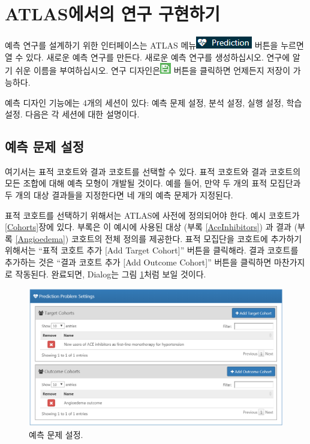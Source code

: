 \documentclass[11pt]{book}
\theoremstyle{definition}
\theoremstyle{definition}
\theoremstyle{definition}
\theoremstyle{remark}
\begin{document}
\section{ATLAS에서의 연구 구현하기}\label{atlas--}

예측 연구를 설계하기 위한 인터페이스는 ATLAS
메뉴\includegraphics{images/PatientLevelPrediction/predictionButton.png}
버튼을 누르면 열 수 있다. 새로운 예측 연구를 만든다. 새로운 예측 연구를
생성하십시오. 연구에 알기 쉬운 이름을 부여하십시오. 연구
디자인은\includegraphics{images/PopulationLevelEstimation/save.png}
버튼을 클릭하면 언제든지 저장이 가능하다. 

예측 디자인 기능에는 4개의 세션이 있다: 예측 문제 설정, 분석 설정, 실행
설정, 학습 설정. 다음은 각 세션에 대한 설명이다.

\subsection{예측 문제 설정}\label{--}

여기서는 표적 코호트와 결과 코호트를 선택할 수 있다. 표적 코호트와 결과
코호트의 모든 조합에 대해 예측 모형이 개발될 것이다. 예를 들어, 만약 두
개의 표적 모집단과 두 개의 대상 결과들을 지정한다면 네 개의 예측 문제가
지정된다.

표적 코호트를 선택하기 위해서는 ATLAS에 사전에 정의되어야 한다. 예시
코호트가 \ref{Cohorts}장에 있다. 부록은 이 예시에 사용된 대상 (부록
\ref{AceInhibitors}) 과 결과 (부록 \ref{Angioedema}) 코호트의 전체
정의를 제공한다. 표적 모집단을 코호트에 추가하기 위해서는 ``표적 코호트
추가 {[}Add Target Cohort{]}'' 버튼을 클릭해라. 결과 코호트를 추가하는
것은 ``결과 코호트 추가 {[}Add Outcome Cohort{]}'' 버튼을 클릭하면
마찬가지로 작동된다. 완료되면, Dialog는 그림
\ref{fig:problemSettings}처럼 보일 것이다.

\begin{figure}

{\centering \includegraphics[width=1\linewidth]{images/PatientLevelPrediction/problemSettings} 

}

\caption{예측 문제 설정.}\label{fig:problemSettings}
\end{figure}
\end{document}
